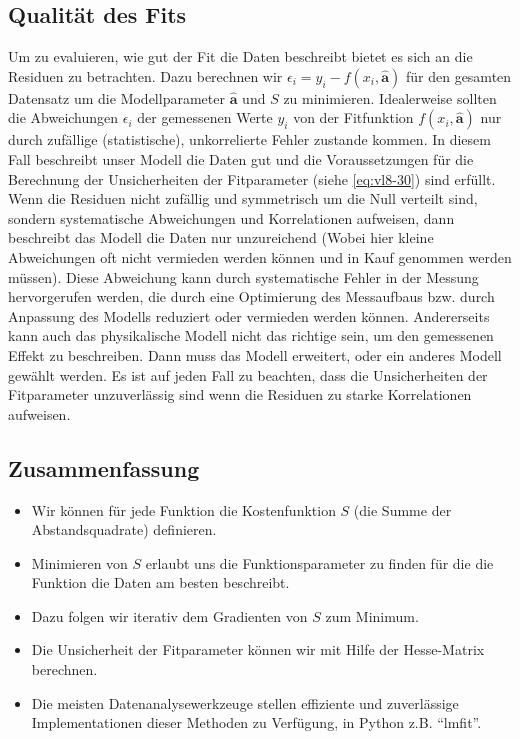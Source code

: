 \subsection{Qualität des Fits}
\label{subsec:vl9-3}

Um zu evaluieren, wie gut der Fit die Daten beschreibt bietet es sich an die Residuen zu betrachten. Dazu berechnen wir $\epsilon_i =y_i - f(x_i, \boldsymbol{\hat{a}})$ für den gesamten Datensatz um die Modellparameter $\boldsymbol{\hat{a}}$ und $S$ zu minimieren. Idealerweise sollten die Abweichungen $\epsilon_i$ der gemessenen Werte $y_i$ von der Fitfunktion $f(x_i, \boldsymbol{\hat{a}})$ nur durch zufällige (statistische), unkorrelierte Fehler zustande kommen. In diesem Fall beschreibt unser Modell die Daten gut und die Voraussetzungen für die Berechnung der Unsicherheiten der Fitparameter (siehe \cref{eq:vl8-30}) sind erfüllt.\\
Wenn die Residuen nicht zufällig und symmetrisch um die Null verteilt sind, sondern systematische Abweichungen und Korrelationen aufweisen, dann beschreibt das Modell die Daten nur unzureichend (Wobei hier kleine Abweichungen oft nicht vermieden werden können und in Kauf genommen werden müssen). Diese Abweichung kann durch systematische Fehler in der Messung hervorgerufen werden, die durch eine Optimierung des Messaufbaus bzw. durch Anpassung des Modells reduziert oder vermieden werden können. Andererseits kann auch das physikalische Modell nicht das richtige sein, um den gemessenen Effekt zu beschreiben. Dann muss das Modell erweitert, oder ein anderes Modell gewählt werden. Es ist auf jeden Fall zu beachten, dass die Unsicherheiten der Fitparameter unzuverlässig sind wenn die Residuen zu starke Korrelationen aufweisen.


\subsection{Zusammenfassung}
\label{subsec:vl9-4}

\begin{itemize}
    \setlength\itemsep{0em}
        \item Wir können für jede Funktion die Kostenfunktion $S$ (die Summe der Abstandsquadrate) definieren.
        \item Minimieren von $S$ erlaubt uns die Funktionsparameter zu finden für die die Funktion die Daten am besten beschreibt.
        \item Dazu folgen wir iterativ dem Gradienten von $S$ zum Minimum.
        \item Die Unsicherheit der Fitparameter können wir mit Hilfe der Hesse-Matrix berechnen.
        \item Die meisten Datenanalysewerkzeuge stellen effiziente und zuverlässige Implementationen dieser Methoden zu Verfügung, in Python z.B. ``lmfit''.
\end{itemize}